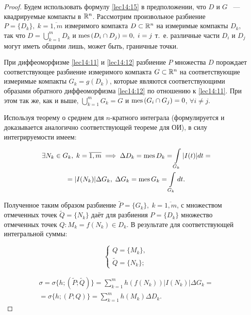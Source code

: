 \documentclass[../../main.tex]{subfiles}
\begin{document}
	
	\begin{proof}
		
	Будем использовать формулу \eqref{lec14:15} в предположении, что
	$D$ и $G$ ~--- квадрируемые компакты в $\mathbb{R}^n$. Рассмотрим произвольное 
	разбиение $P =
	\{ D_k \},\; k = \overline{1, m}$ измеримого компакта $D \subset 
	\mathbb{R}^n$ на измеримые компакты $D_k$, так что $D = \bigcup\limits_{k = 1}^{m} 
	D_k$ 
	и $\operatorname{mes}\left(D_i \cap D_j\right) = 0,\; i = j$ т.~е. различные части $D_i$ и 
	$D_j$ могут иметь общими лишь, может быть, граничные точки.
		   
	При диффеоморфизме \eqref{lec14:11} и \eqref{lec14:12} разбиение $P$ 
	множества $D$ порождает соответствующее разбиение измеримого компакта 
	$G \subset \mathbb{R}^n$ на соответствующие измеримые компакты
	$G_k = g(D_k)$, которые являются соответствующими образами обратного 
	диффеоморфизма 
	\eqref{lec14:12} по отношению к \eqref{lec14:11}. При этом так же, как и выше,
	$
	\bigcup\limits_{k = 1}^{m} G_k = G$ и $\operatorname{mes}\left(G_i \cap G_j\right) = 0$, 
	$\forall i \neq j$.
	
	Используя теорему о среднем для $n$-кратного интеграла (формулируется и 
	доказывается аналогично соответствующей теореме для ОИ), 
	в силу интегрируемости имеем:
	
	\[
	\begin{gathered}
	\exists N_k \in G_k,\; k = \overline{1, m} \implies \Delta D_k = \operatorname{mes} D_k 
	= \int\limits_{G_k} |I(t)| dt = \\ = |I(N_k)|
	 \Delta G_k,\; \Delta G_k = \operatorname{mes} G_k = \int\limits_{G_k} dt.
	\end{gathered}
	\]
	
	Полученное таким образом разбиение $\widetilde{P} = \{ G_k  \},\; 
	k = \overline{1, m}$, с множеством отмеченных точек $\widetilde{Q} = \{ N_k \}$
	даёт для разбиения $P = \{D_k\}$ множество отмеченных точек $Q : M_k = 
	f(N_k) 
	\in D_k$. В результате для соответствующей интегральной суммы:
	
	\[
	\begin{cases}
	Q = \{ M_k \},\\
	\widetilde{Q} = \{ N_k \};
	\end{cases}
	\]
	
	\begin{equation}
	\label{lec15:40}
	\begin{gathered}
	\sigma = \sigma \{ h; (\widetilde{P}; \widetilde{Q}) \} = \sum_{k = 1}^{m} h 
	\left( f \left( N_k \right) \right)|I(N_k)| \Delta G_k = \\ = 
	\sigma \{ h; \left( P; Q \right) \} = \sum_{k = 1}^{m} h 
	\left( M_k \right) \Delta D_k.
	\end{gathered}
	\end{equation}
	

\end{proof}
\end{document}
